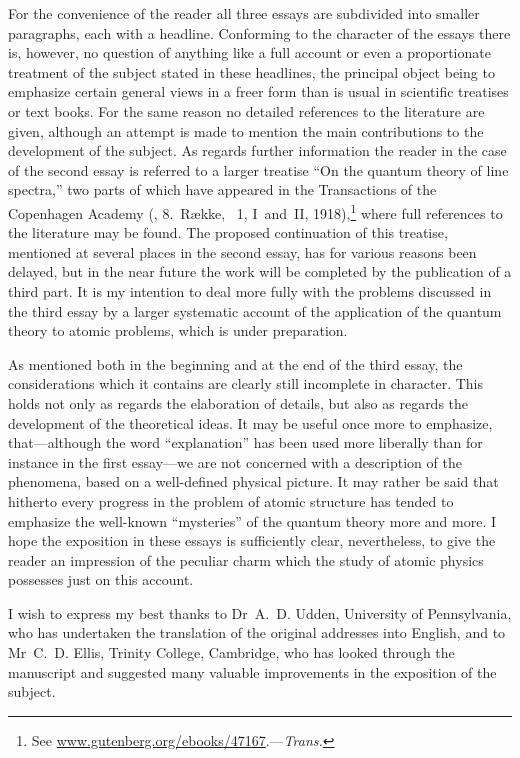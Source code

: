 For the convenience of the reader all three essays are subdivided
into smaller paragraphs, each with a headline. Conforming to the
character of the essays there is, however, no question of anything
like a full account or even a proportionate treatment of the subject
stated in these headlines, the principal object being to emphasize
certain general views in a freer form than is usual in scientific
treatises or text books. For the same reason no detailed references
to the literature are given, although an attempt is made to mention
the main contributions to the development of the subject. As
regards further information the reader in the case of the second
essay is referred to a larger treatise ``On the quantum theory of
line spectra,'' two parts of which have appeared in the Transactions of
the Copenhagen Academy (,
8.\ Række, ~1, I~and~II, 1918),\footnote
  {See \href{http://www.gutenberg.org/ebooks/47167}{www.gutenberg.org/ebooks/47167}.---\textit{Trans.}}
where full references to the literature
may be found. The proposed continuation of this treatise, mentioned
at several places in the second essay, has for various reasons been
delayed, but in the near future the work will be completed by the
publication of a third part. It is my intention to deal more fully
with the problems discussed in the third essay by a larger systematic
account of the application of the quantum theory to atomic
problems, which is under preparation.

As mentioned both in the beginning and at the end of the
third essay, the considerations which it contains are clearly still
incomplete in character. This holds not only as regards the
elaboration of details, but also as regards the development of the
theoretical ideas. It may be useful once more to emphasize,
that---although the word ``explanation'' has been used more
liberally than for instance in the first essay---we are not concerned
with a description of the phenomena, based on a well-defined
physical picture. It may rather be said that hitherto every
progress in the problem of atomic structure has tended to emphasize
the well-known ``mysteries'' of the quantum theory more and more.
I hope the exposition in these essays is sufficiently clear, nevertheless,
to give the reader an impression of the peculiar charm
which the study of atomic physics possesses just on this account.

I wish to express my best thanks to Dr~A.~D. Udden, University
of Pennsylvania, who has undertaken the translation of the
original addresses into English, and to Mr~C.~D. Ellis, Trinity
College, Cambridge, who has looked through the manuscript and
suggested many valuable improvements in the exposition of the
subject.

